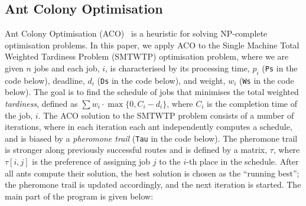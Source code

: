 \documentclass[final]{jfp1}
\begin{document}

\subsection{Ant Colony Optimisation}
Ant Colony Optimisation (ACO)~\cite{aco} is a heuristic for solving NP-complete
optimisation problems. %
In this paper, we apply ACO to the 
Single Machine Total Weighted Tardiness Problem (SMTWTP) optimisation
problem, where we are given $n$ jobs
and each job, $i$, is characterised by its processing time, $p_i$
(\lstinline{Ps} in the code below),
deadline, $d_i$ (\lstinline{Ds} in the code below),  and weight,
$w_i$ (\lstinline{Ws} in the code below). The goal is to find the schedule
of jobs that minimises the total weighted
\emph{tardiness}, defined as $\sum w_i \cdot \max \{0, C_i-d_i\}$, where $C_i$ is the
completion time of the job, $i$.
The ACO solution to the SMTWTP problem consists of a number of
iterations, where in each iteration each ant
independently computes a schedule, and is biased by
a \emph{pheromone trail} (\lstinline{Tau} in the code below). 
The pheromone trail is stronger along previously successful routes and 
is defined 
by a matrix, $\tau$, where $\tau[i,j]$ is the preference of assigning 
job $j$ to the $i$-th place in the schedule. 
After all ants compute their solution, the best solution is chosen as
the ``running best''; the pheromone trail is updated accordingly, and
the next iteration is started. The main part of the program is given
below:
\end{document}
